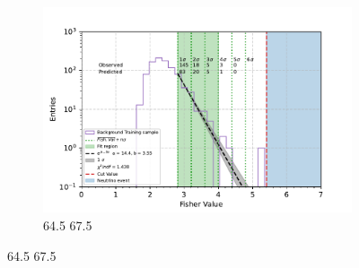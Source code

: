 \begin{figure}[h!]
\begin{subfigure}[l]{.48\textwidth}
      \includegraphics[width=\linewidth]{thesis_figures/Nu_analysis/Fisher_plots/Fisher_fit_region_64.5_67.5.pdf}
      \caption{64.5 67.5}
    \end{subfigure}


\end{figure}
